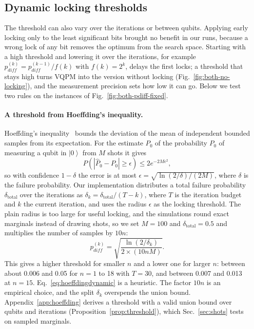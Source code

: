\documentclass[onecolumn,10pt]{article}
\newcommand{\ket}[1]{\ensuremath{\left|#1\right\rangle}} %
\theoremstyle{remark}
\theoremstyle{plain}
\begin{document}
\subsection{Dynamic locking thresholds}
\label{sec:strategies}
The threshold can also vary over the iterations or between qubits. Applying early locking only to the least significant bits brought no benefit in our runs, because a wrong lock of any bit removes the optimum from the search space. Starting with a high threshold and lowering it over the iterations, for example \(p_{diff}^{(k)}=p_{diff}^{(k-1)}/f(k)\) with \(f(k)=2^k\), delays the first locks; a threshold that stays high turns VQPM into the version without locking (Fig.~\ref{fig:both-no-locking}), and the measurement precision sets how low it can go. Below we test two rules on the instances of Fig.~\ref{fig:both-pdiff-fixed}.

\paragraph{A threshold from Hoeffding's inequality.}
\label{sec:hoeffding}
Hoeffding's inequality~\cite{hoeffding1994probability} bounds the deviation of the mean of independent bounded samples from its expectation. For the estimate \(\hat P_0\) of the probability \(P_0\) of measuring a qubit in \(\ket{0}\) from \(M\) shots it gives~\cite{Phillips2012ChernoffHoeffdingIA}
\begin{equation}
P\left(|\hat{P}_0 - P_0| \geq \epsilon\right) \leq 2e^{-2M\epsilon^2},
\end{equation}
so with confidence \(1-\delta\) the error is at most \(\epsilon=\sqrt{\ln(2/\delta)/(2M)}\), where \(\delta\) is the failure probability. Our implementation distributes a total failure probability \(\delta_{\text{total}}\) over the iterations as \(\delta_k=\delta_{\text{total}}/(T-k)\), where \(T\) is the iteration budget and \(k\) the current iteration, and uses the radius \(\epsilon\) as the locking threshold. The plain radius is too large for useful locking, and the simulations round exact marginals instead of drawing shots, so we set \(M=100\) and \(\delta_{\text{total}}=0.5\) and multiplies the number of samples by \(10n\):
\begin{equation}
\label{eq:hoeffdingdynamic}
       p_{diff}^{(k)} = \sqrt{\frac{\ln(2/\delta_k)}{2\times (10nM)}}.
\end{equation}
This gives a higher threshold for smaller \(n\) and a lower one for larger \(n\): between about 0.006 and 0.05 for \(n=1\) to 18 with \(T=30\), and between 0.007 and 0.013 at \(n=15\). Eq.~\eqref{eq:hoeffdingdynamic} is a heuristic. The factor \(10n\) is an empirical choice, and the split \(\delta_k\) overspends the union bound. Appendix~\ref{app:hoeffding} derives a threshold with a valid union bound over qubits and iterations (Proposition~\ref{prop:threshold}), which Sec.~\ref{sec:shots} tests on sampled marginals.
\end{document}
